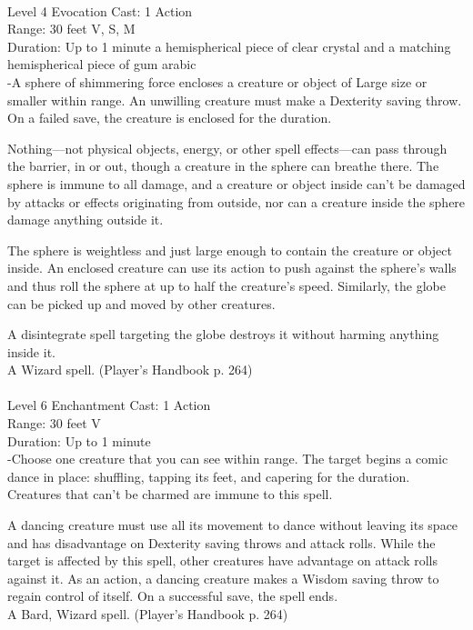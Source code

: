 \documentclass[10pt,twocolumn]{report}
\begin{document}
 \\
Level 4 \quad Evocation \quad Cast: 1 Action\\
Range: 30 feet \quad V, S, M\\
Duration: Up to 1 minute \quad a hemispherical piece of clear crystal and a matching hemispherical piece of gum arabic\\
-A sphere of shimmering force encloses a creature or object of Large size or smaller within range. An unwilling creature must make a Dexterity saving throw. On a failed save, the creature is enclosed for the duration.

Nothing---not physical objects, energy, or other spell effects---can pass through the barrier, in or out, though a creature in the sphere can breathe there. The sphere is immune to all damage, and a creature or object inside can’t be damaged by attacks or effects originating from outside, nor can a creature inside the sphere damage anything outside it.

The sphere is weightless and just large enough to contain the creature or object inside. An enclosed creature can use its action to push against the sphere’s walls and thus roll the sphere at up to half the creature’s speed. Similarly, the globe can be picked up and moved by other creatures.

A disintegrate spell targeting the globe destroys it without harming anything inside it.\\
A Wizard spell. (Player's Handbook p. 264) \\


 \\
Level 6 \quad Enchantment \quad Cast: 1 Action\\
Range: 30 feet \quad V\\
Duration: Up to 1 minute \quad \\
-Choose one creature that you can see within range. The target begins a comic dance in place: shuffling, tapping its feet, and capering for the duration. Creatures that can’t be charmed are immune to this spell.

A dancing creature must use all its movement to dance without leaving its space and has disadvantage on Dexterity saving throws and attack rolls. While the target is affected by this spell, other creatures have advantage on attack rolls against it. As an action, a dancing creature makes a Wisdom saving throw to regain control of itself. On a successful save, the spell ends.\\
A Bard, Wizard spell. (Player's Handbook p. 264) \\
\end{document}
